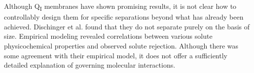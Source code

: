 \documentclass[journal=jpcbfk,manuscript=article]{achemso}
\begin{document}
  Although Q\textsubscript{I} membranes have shown promising results, it
  is not clear how to controllably design them for specific separations
  beyond what has already been achieved. Dischinger et al. found that they
  do not separate purely on the basis of size. Empirical modeling revealed
  correlations between various solute physicochemical properties and 
  observed solute rejection. Although there was some agreement with their
  empirical model, it does not offer a sufficiently detailed explanation
  of governing molecular interactions.~\cite{dischinger_effect_2017}

  
\end{document}

